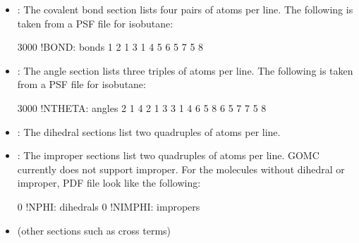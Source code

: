 \documentclass[letterpaper,10pt,english]{sphinxmanual}
\begin{document}
\begin{itemize}
\item {} 
\sphinxAtStartPar
{}: The covalent bond section lists four pairs of atoms per line. The following is taken from a PSF file for isobutane:

\begin{sphinxVerbatim}[commandchars=\\\{\}]
3000   !BOND:     bonds
1   2   1   3   1   4   5   6
5   7   5   8
\end{sphinxVerbatim}

\item {} 
\sphinxAtStartPar
{}: The angle section lists three triples of atoms per line. The following is taken from a PSF file for isobutane:

\begin{sphinxVerbatim}[commandchars=\\\{\}]
3000   !NTHETA:   angles
2   1   4   2   1   3   3   1   4
6   5   8   6   5   7   7   5   8
\end{sphinxVerbatim}

\item {} 
\sphinxAtStartPar
{}: The dihedral sections list two quadruples of atoms per line.

\item {} 
\sphinxAtStartPar
{}: The improper sections list two quadruples of atoms per line. GOMC currently does not support improper. For the molecules without dihedral or improper, PDF file look like the following:

\begin{sphinxVerbatim}[commandchars=\\\{\}]
0   !NPHI: dihedrals
0   !NIMPHI: impropers
\end{sphinxVerbatim}

\item {} 
\sphinxAtStartPar
(other sections such as cross terms)

\end{itemize}
\end{document}
